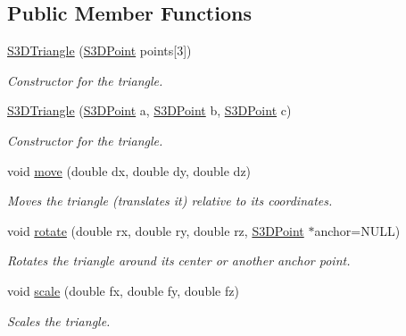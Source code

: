 \subsection*{Public Member Functions}
\begin{DoxyCompactItemize}
\item 
\hyperlink{class_s3_d_triangle_a2ac27d0814934c422e3fbf593c77014e}{S3DTriangle} (\hyperlink{class_s3_d_point}{S3DPoint} points\mbox{[}3\mbox{]})
\begin{DoxyCompactList}\small\item\em Constructor for the triangle. \item\end{DoxyCompactList}\item 
\hyperlink{class_s3_d_triangle_a6709f19586226831dc2a50466e3e669e}{S3DTriangle} (\hyperlink{class_s3_d_point}{S3DPoint} a, \hyperlink{class_s3_d_point}{S3DPoint} b, \hyperlink{class_s3_d_point}{S3DPoint} c)
\begin{DoxyCompactList}\small\item\em Constructor for the triangle. \item\end{DoxyCompactList}\item 
void \hyperlink{class_s3_d_triangle_a7f168122e4ed627fcb6489852a56982b}{move} (double dx, double dy, double dz)
\begin{DoxyCompactList}\small\item\em Moves the triangle (translates it) relative to its coordinates. \item\end{DoxyCompactList}\item 
void \hyperlink{class_s3_d_triangle_a3e739f6c9c176e58cb734db7328cf039}{rotate} (double rx, double ry, double rz, \hyperlink{class_s3_d_point}{S3DPoint} $\ast$anchor=NULL)
\begin{DoxyCompactList}\small\item\em Rotates the triangle around its center or another anchor point. \item\end{DoxyCompactList}\item 
void \hyperlink{class_s3_d_triangle_a0808a047e513fb2322e3fc6465c7c011}{scale} (double fx, double fy, double fz)
\begin{DoxyCompactList}\small\item\em Scales the triangle. \item\end{DoxyCompactList}\item 

\end{DoxyCompactItemize}
